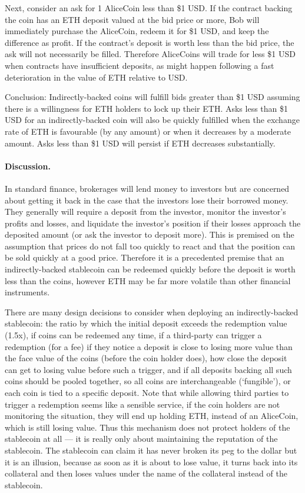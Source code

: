 
Next, consider an ask for 1 AliceCoin less than \$1 USD. If the contract backing the coin has an ETH deposit valued at the bid price or more, Bob will immediately purchase the AliceCoin, redeem it for \$1 USD, and keep the difference as profit. If the contract's deposit is worth less than the bid price, the ask will not necessarily be filled. Therefore AliceCoins will trade for less \$1 USD when contracts have insufficient deposits, as might happen following a fast deterioration in the value of ETH relative to USD.

Conclusion: Indirectly-backed coins will fulfill bids greater than \$1 USD assuming there is a willingness for ETH holders to lock up their ETH. Asks less than \$1 USD for an indirectly-backed coin will also be quickly fulfilled when the exchange rate of ETH is favourable (by any amount) or when it decreases by a moderate amount. Asks less than \$1 USD will persist if ETH decreases substantially.

\paragraph{Discussion.} In standard finance, brokerages will lend money to investors but are concerned about getting it back in the case that the investors lose their borrowed money. They generally will require a deposit from the investor, monitor the investor's profits and losses, and liquidate the investor's position if their losses approach the deposited amount (or ask the investor to deposit more). This is premised on the assumption that prices do not fall too quickly to react and that the position can be sold quickly at a good price. Therefore it is a precedented premise that an indirectly-backed stablecoin can be redeemed quickly before the deposit is worth less than the coins, however ETH may be far more volatile than other financial instruments.

There are many design decisions to consider when deploying an indirectly-backed stablecoin: the ratio by which the initial deposit exceeds the redemption value (\eg 1.5x), if coins can be redeemed any time, if a third-party can trigger a redemption (\eg for a fee) if they notice a deposit is close to losing more value than the face value of the coins (before the coin holder does), how close the deposit can get to losing value before such a trigger, and if all deposits backing all such coins should be pooled together, so all coins are interchangeable (`fungible'), or each coin is tied to a specific deposit. Note that while allowing third parties to trigger a redemption seems like a sensible service, if the coin holders are not monitoring the situation, they will end up holding ETH, instead of an AliceCoin, which is still losing value. Thus this mechanism does not protect holders of the stablecoin at all --- it is really only about maintaining the reputation of the stablecoin. The stablecoin can claim it has never broken its peg to the dollar but it is an illusion, because as soon as it is about to lose value, it turns back into its collateral and then loses values under the name of the collateral instead of the stablecoin. 

